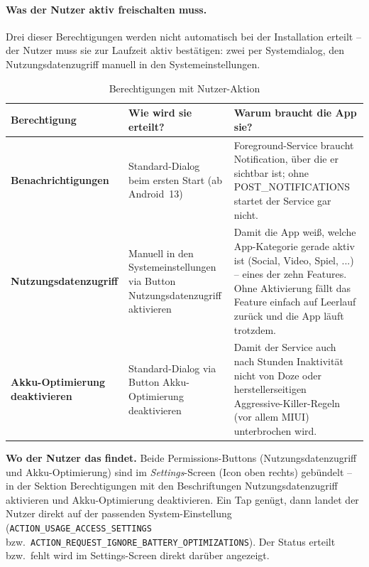 \documentclass[12pt, a4paper, ngerman]{article}
\newcommand{\code}[1]{\texttt{#1}}
\begin{document}
\paragraph{Was der Nutzer aktiv freischalten muss.}
Drei dieser Berechtigungen werden nicht automatisch bei der
Installation erteilt -- der Nutzer muss sie zur Laufzeit aktiv
bestätigen: zwei per Systemdialog, den Nutzungsdatenzugriff manuell
in den Systemeinstellungen.

\begin{table}[H]
\centering
\caption{Berechtigungen mit Nutzer-Aktion}
\label{tab:user_permissions}
\small
\renewcommand{\arraystretch}{1.25}
\begin{tabular}{p{3.8cm}p{4.5cm}p{7cm}}
\toprule
\textbf{Berechtigung} & \textbf{Wie wird sie erteilt?} & \textbf{Warum braucht die App sie?} \\
\midrule
\textbf{Benachrichtigungen} & Standard-Dialog beim ersten Start (ab Android~13) &
  Foreground-Service braucht Notification, über die er sichtbar
  ist; ohne POST\_NOTIFICATIONS startet der Service gar nicht. \\
\textbf{Nutzungsdatenzugriff} & Manuell in den Systemeinstellungen via Button \glqq{}Nutzungsdaten\-zugriff aktivieren\grqq{} &
  Damit die App weiß, welche App-Kategorie gerade aktiv ist
  (Social, Video, Spiel, ...) -- eines der zehn Features.
  Ohne Aktivierung fällt das Feature einfach auf \glqq{}Leerlauf\grqq{}
  zurück und die App läuft trotzdem. \\
\textbf{Akku-Optimierung deaktivieren} & Standard-Dialog via Button \glqq{}Akku-Optimierung deaktivieren\grqq{} &
  Damit der Service auch nach Stunden Inaktivität nicht von Doze
  oder herstellerseitigen Aggressive-Killer-Regeln (vor allem MIUI)
  unterbrochen wird. \\
\bottomrule
\end{tabular}
\end{table}

\begin{samepage}
\textbf{Wo der Nutzer das findet.}
Beide Permissions-Buttons (Nutzungsdatenzugriff und
Akku-Optimierung) sind im \emph{Settings}-Screen (Icon
oben rechts) gebündelt -- in der Sektion
\glqq{}Berechtigungen\grqq{} mit den Beschriftungen
\glqq{}Nutzungsdatenzugriff aktivieren\grqq{} und
\glqq{}Akku-Optimierung deaktivieren\grqq{}. Ein Tap genügt, dann
landet der Nutzer direkt auf der passenden System-Einstellung
(\code{ACTION\_USAGE\_\allowbreak ACCESS\_SETTINGS} bzw.\
\code{ACTION\_REQUEST\_\allowbreak IGNORE\_BATTERY\_\allowbreak OPTIMIZATIONS}). Der Status
\glqq{}erteilt\grqq{} bzw.\ \glqq{}fehlt\grqq{} wird im Settings-Screen
direkt darüber angezeigt.
\end{samepage}
\end{document}

